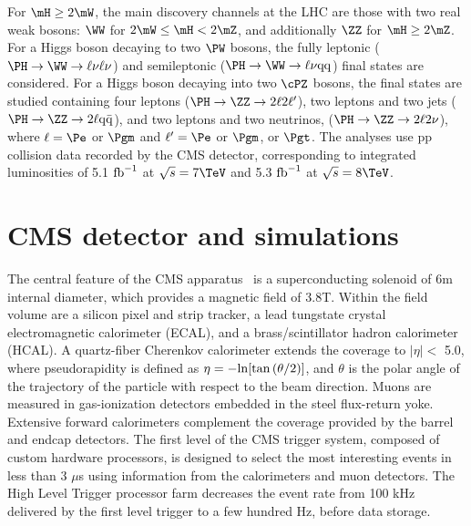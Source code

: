 For $\mH \ge 2\mW$, the main discovery channels at 
the LHC are those
with two real weak bosons: $\WW$ for $2\mW \le \mH < 2 \mZ$, and
additionally $\ZZ$ for $\mH \ge 2\mZ$.
For a
Higgs boson decaying to two $\PW$ bosons, the fully leptonic ($\PH \to
\WW \to \ell\nu\ell\nu$) and semileptonic ($\PH \to \WW \to \ell \nu
\mathrm{qq}$) final states are considered.  For a Higgs boson decaying into two $\cPZ$
bosons, the final states are studied containing 
four leptons ($\PH \to \ZZ
\to 2\ell 2\ell '$),
two leptons and two
jets ($\PH \to \ZZ \to
2\ell \mathrm{q\bar{q}}$), and two leptons and two neutrinos, ($\PH
\to \ZZ \to 2\ell 2\nu$), 
where $\ell = \Pe$ or $\Pgm$ and $\ell ' = \Pe$ or
$\Pgm$, or $\Pgt$.  The analyses use pp collision data recorded by the
CMS detector, corresponding to integrated luminosities of
5.1 ${\rm fb}^{-1}$ at $\sqrt{s} = 7\TeV$ and 5.3 ${\rm fb}^{-1}$ at
$\sqrt{s} = 8\TeV$.


\section{CMS detector and simulations}
\label{sec:cms}

The central feature of the CMS apparatus~\cite{Chatrchyan:2008zzk} is
a superconducting solenoid of 6\unit{m} internal diameter, which
provides a magnetic field of 3.8\unit{T}. Within the field volume are
a silicon pixel and strip tracker, a lead tungstate crystal
electromagnetic calorimeter (ECAL), and a brass/scintillator hadron
calorimeter (HCAL). 
A quartz-fiber
Cherenkov calorimeter extends the coverage to $|\eta| <$ 5.0, where pseudorapidity
is defined as $\eta=-{\rm ln}[\tan{(\theta/2)}]$,
and $\theta$ is the polar angle of the trajectory of the particle
with respect to the beam direction. 
Muons are measured in gas-ionization detectors
embedded in the steel flux-return yoke. Extensive forward calorimeters
complement the coverage provided by the barrel and endcap detectors.
The first level of the CMS trigger system, composed of custom
hardware processors, is designed to select the most interesting events
in less than 3 $\mu$s using information from the calorimeters and muon
detectors. The High Level Trigger processor farm 
decreases the event rate from 100 kHz delivered by the first level trigger
 to a few hundred Hz, before data storage.

